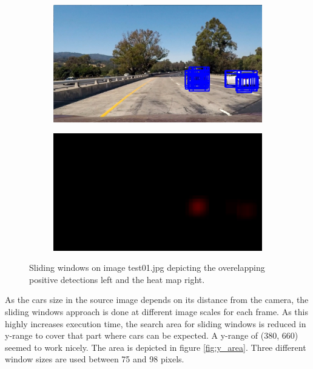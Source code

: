 \documentclass[a4paper, 11pt, DIV=14]{scrartcl}
\begin{document}
\begin{figure}[h]
    \centering
    \begin{subfigure}{0.45\textwidth}
        \includegraphics[width=\textwidth]{output_images/test1_bboxes.jpg}
    \end{subfigure}\quad
    \begin{subfigure}{0.45\textwidth}
        \includegraphics[width=\textwidth]{output_images/test1_heat.jpg}
    \end{subfigure} 
    \caption{Sliding windows on image test01.jpg depicting the overelapping positive detections left and the heat map right.}
    \label{fig:sliding_windows}
\end{figure}

As the cars size in the source image depends on its distance from the camera, the sliding windows approach is done at different image scales for each frame. As this highly increases execution time, the search area for sliding windows is reduced in y-range to cover that part where cars can be expected. A y-range of (380, 660) seemed to work nicely. The area is depicted in figure \ref{fig:y_area}. Three different window sizes are used between 75 and 98 pixels.
\end{document}
